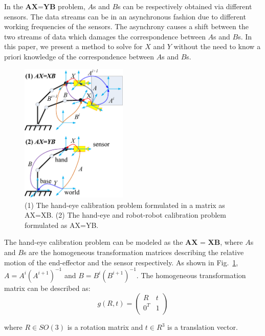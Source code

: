 \documentclass[conference,letterpaper]{IEEEtran}
\begin{document}
In the $\textbf{AX=YB}$ problem, $A$s and $B$s can be respectively obtained via different sensors. The data streams can be in an asynchronous fashion due to different working frequencies of the sensors. The asynchrony causes a shift between the two streams of data which damages the correspondence between $A$s and $B$s. In this paper, we present a method to solve for $X$ and $Y$ without the need to know a priori knowledge of the correspondence between $A$s and $B$s.

\begin{center}
\begin{figure}[htbp]
\centering
\includegraphics[width=2in]{fig1.eps}
\caption{
(1) The hand-eye calibration problem formulated in a matrix as AX=XB. (2) The hand-eye and robot-robot calibration problem formulated as AX=YB.
}
\label{fig1}
\end{figure}
\end{center}

The hand-eye calibration problem can be modeled as the $\textbf{AX = XB}$, where $A$s and $B$s are the homogeneous transformation matrices describing the relative motion of the end-effector and the sensor respectively. As shown in Fig.~\ref{fig1}, $A = A^{i}(A^{i+1})^{-1}$ and $B = B^{i}(B^{i+1})^{-1}$. The homogeneous transformation matrix can be described as:
\begin{equation}\label{equ0}
    g(R,t)=\left(
             \begin{array}{cc}
               R & t \\
               0^{T} & 1 \\
             \end{array}
           \right)
\end{equation}

where $R \in SO(3)$ is a rotation matrix and $t \in R^{3}$ is a translation vector.
\end{document}
